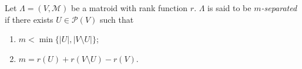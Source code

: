 Let $\Lambda = (V, \mathcal{M})$ be a matroid with rank function $r$. $\Lambda$ is said to be \textit{$m$-separated} if there exists $U \in \mathcal{P}(V)$ such that
\begin{enumerate}
\item $m < \min\{|U|, |V \setminus U|\}$;
\item $m = r(U) + r(V \setminus U) - r(V)$.
\end{enumerate}
